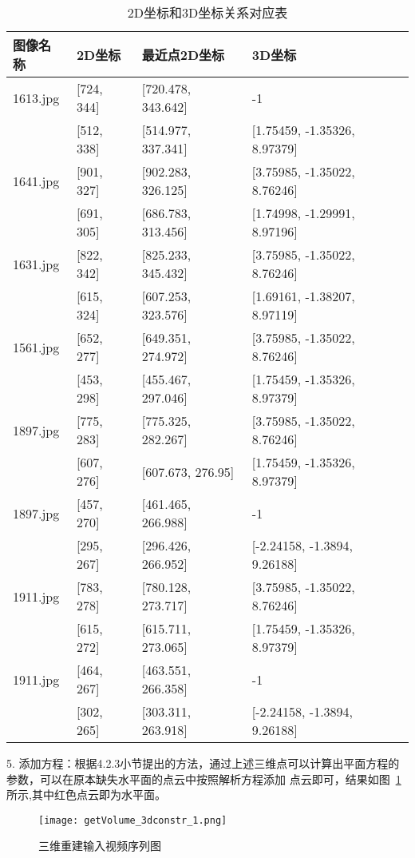 \begin{table}[h]
  \centering
  \caption{2D坐标和3D坐标关系对应表}
  \label{tab:chap1:2D_3D}
  \begin{tabular}{C{1.6cm}L{2.4cm}L{4.4cm}L{4.4cm}}
  \toprule
  \textbf{图像名称} & \textbf{2D坐标} &\textbf{最近点2D坐标} &  \textbf{3D坐标}  \\
  \midrule
  1613.jpg  &[724, 344]   &[720.478,  343.642]  & -1\\
            &[512, 338]   &[514.977,  337.341]  & [1.75459, -1.35326, 8.97379]\\
  1641.jpg  &[901, 327]   &[902.283,  326.125]  & [3.75985, -1.35022, 8.76246]\\
            &[691, 305]   &[686.783,  313.456]  & [1.74998, -1.29991, 8.97196]\\
  1631.jpg  &[822, 342]   &[825.233,  345.432]  &[3.75985, -1.35022, 8.76246]\\
            &[615, 324]   &[607.253,  323.576]  &[1.69161, -1.38207, 8.97119]\\
  1561.jpg  &[652, 277]   &[649.351,  274.972]  &[3.75985, -1.35022, 8.76246]\\
            &[453, 298]   &[455.467,  297.046]  &[1.75459, -1.35326, 8.97379]\\
  1897.jpg  &[775, 283]   &[775.325,  282.267]  &[3.75985, -1.35022, 8.76246]\\
            &[607, 276]   &[607.673,  276.95]   &[1.75459, -1.35326, 8.97379]\\
  1897.jpg  &[457, 270]   &[461.465,  266.988]  & -1\\
            &[295, 267]   &[296.426,  266.952]  &[-2.24158, -1.3894, 9.26188]\\
  1911.jpg  &[783, 278]   &[780.128,  273.717]  &[3.75985, -1.35022, 8.76246]\\
            &[615, 272]   &[615.711,  273.065]  &[1.75459, -1.35326, 8.97379]\\
  1911.jpg  &[464, 267]   &[463.551,  266.358]  &-1\\
            &[302, 265]   &[303.311,  263.918]  &[-2.24158, -1.3894, 9.26188]\\
  \bottomrule
  \end{tabular}
\end{table}

5.	添加方程：根据4.2.3小节提出的方法，通过上述三维点可以计算出平面方程的参数，可以在原本缺失水平面的点云中按照解析方程添加
点云即可，结果如图~\ref{fig:getVolume_3dconstr}所示,其中红色点云即为水平面。
\begin{figure}[H] %
  \centering
  \texttt{[image: getVolume\_3dconstr\_1.png]}
  \caption{三维重建输入视频序列图}
  \label{fig:getVolume_3dconstr}
  \end{figure}


